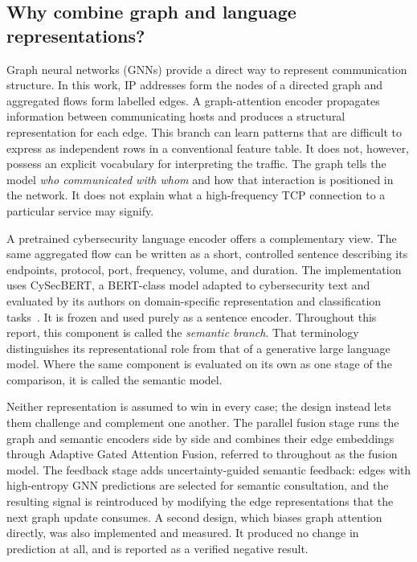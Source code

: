 \subsection{Why combine graph and language representations?}

Graph neural networks (GNNs) provide a direct way to represent communication structure.
In this work, IP addresses form the nodes of a directed graph and aggregated flows form
labelled edges. A graph-attention encoder propagates information between communicating
hosts and produces a structural representation for each edge. This branch can learn
patterns that are difficult to express as independent rows in a conventional feature
table. It does not, however, possess an explicit vocabulary for interpreting the traffic.
The graph tells the model \emph{who communicated with whom} and how that interaction is
positioned in the network. It does not explain what a high-frequency TCP
connection to a particular service may signify.

A pretrained cybersecurity language encoder offers a complementary view. The same
aggregated flow can be written as a short, controlled sentence describing its endpoints,
protocol, port, frequency, volume, and duration. The implementation uses CySecBERT, a
BERT-class model adapted to cybersecurity text and evaluated by its authors on
domain-specific representation and classification tasks~\citep{bayer2024cysecbert}. It is
frozen and used purely as a sentence encoder. Throughout this report, this component is
called the \emph{semantic branch}. That terminology distinguishes its representational
role from that of a generative large language model. Where the same component is evaluated on
its own as one stage of the comparison, it is called the semantic model.

Neither representation is assumed to win in every case; the design instead lets them
challenge and complement one another. The parallel fusion stage runs
the graph and semantic encoders side by side and combines their edge embeddings through
Adaptive Gated Attention Fusion, referred to throughout as the fusion model. The feedback stage adds uncertainty-guided
semantic feedback: edges with high-entropy GNN predictions are selected for semantic
consultation, and the resulting signal is reintroduced by modifying the edge
representations that the next graph update consumes. A second design, which biases graph
attention directly, was also implemented and measured. It produced no change in prediction
at all, and is reported as a verified negative result.

